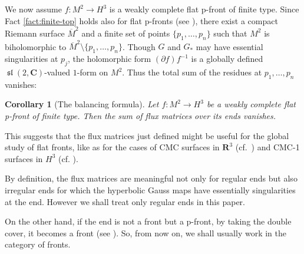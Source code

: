 \documentclass[a4paper]{amsart}
\theoremstyle{plain}
\newtheorem{corollary}[theorem]{Corollary}
\theoremstyle{remark}
\numberwithin{equation}{section}
\begin{document}
We now assume $f\colon M^2\to H^3$ is a weakly complete flat p-front
of finite type. 
Since Fact \ref{fact:finite-top} holds also for flat p-fronts
(see \cite[Proposition 5.4]{KRUY}), 
there exist a compact Riemann surface $\overline M^2$
and a finite set of points $\{p_1,\dots,p_n\}$ such that
$M^2$ is biholomorphic to 
$\overline M^2\setminus \{p_1,\dots,p_n\}$.
Though $G$ and $G_*$ may have essential singularities
at $p_j$, the holomorphic form $(\partial f) f^{-1}$ is a 
globally defined ${\operatorname{\mathfrak{sl}}}(2,{\boldsymbol{C}})$-valued $1$-form on $M^2$.
Thus the total sum of the residues at $p_1,\dots,p_n$ vanishes:
\begin{corollary}[The balancing formula]\label{lem:flux} 
 Let $f \colon M^2\to H^3$ be a weakly complete flat p-front
 of finite type. 
 Then the sum of flux matrices  over its ends vanishes.
\end{corollary}
This suggests that the flux matrices just defined might 
be useful for the global study of flat fronts,
like as for the cases of CMC surfaces in ${\boldsymbol{R}}^3$ 
(cf.\ \cite{KKS}) and CMC-1 surfaces in $H^3$ (cf. \cite{RUY}).

By definition, the flux matrices are meaningful not only for 
regular ends but also irregular ends for which the hyperbolic Gauss
maps have essentially singularities at the end.
However we shall treat only regular ends in this paper.

On the other hand, if the end is not a front but a p-front,
by taking the double cover, it becomes a front 
(see \cite[Corollary 5.2]{KRUY}). 
So, from now on, 
we shall usually work in the category of fronts.
\end{document}
